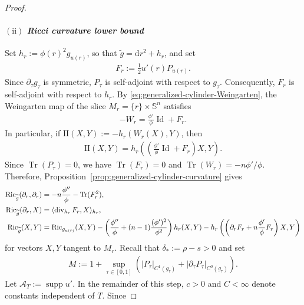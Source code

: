 \documentclass[11pt,reqno]{amsart}
\numberwithin{equation}{section}
\theoremstyle{definition}
\theoremstyle{remark}
\def\cA {\mathcal{A}}
\newcommand{\la}{\langle}
\newcommand{\ra}{\rangle}
\renewcommand{\div}{\operatorname{div}}
\newcommand{\supp}{\operatorname{supp}}
\newcommand{\Tr}{\operatorname{Tr}}
\newcommand{\Id}{\operatorname{Id}}
\newcommand{\ta}{\tau}
\newcommand{\ud}{\mathrm{d}}
\newcommand{\0}{\emptyset}
\newcommand{\bbS}{\mathbb S}
\newcommand{\Ric}{\operatorname{Ric}}
\begin{document}
\begin{proof}
\paragraph{$\mathrm{(ii)}$ \textit{Ricci curvature lower bound}} Set
$h_r:=\phi(r)^2g_{u(r)}$, so that
$\widetilde g=\ud r^2+h_r$, and set
\begin{align}
        F_r
        :=
        \frac12u'(r)P_{u(r)}.
\end{align}
Since $\partial_\ta g_\ta$ is symmetric, $P_\ta$ is self-adjoint with
respect to $g_\ta$. Consequently, $F_r$ is self-adjoint with respect to
$h_r$. By \eqref{eq:generalized-cylinder-Weingarten}, the Weingarten map of the slice $M_r=\{r\}\times\bbS^n$ satisfies
\begin{align}\label{eq:gaussian-split-shape-operator}
        -W_r
        =
        \frac{\phi'}{\phi}\Id+F_r.
\end{align}
In particular, if
$\mathrm{II}(X,Y):=-h_r(W_r(X),Y)$, then
\begin{align}
        \mathrm{II}(X,Y)
        =
        h_r
        \left(
        \left(
        \frac{\phi'}{\phi}\Id+F_r
        \right)X,Y
        \right).
\end{align}
Since $\Tr(P_\ta)=0$, we have
$\Tr(F_r)=0$ and
$\Tr(W_r)=-n\phi'/\phi$. Therefore,
Proposition~\ref{prop:generalized-cylinder-curvature} gives
\begin{align}\label{eq:gaussian-split-Ricci-rr-exact}
        \Ric_{\widetilde g}(\partial_r,\partial_r)
        &=
        -n\frac{\phi''}{\phi}
        -
        \Tr(F_r^2),\notag\\
        \Ric_{\widetilde g}(\partial_r,X)
        &=
        \la\div_{h_r}F_r,X\ra_{h_r},\notag\\
        \Ric_{\widetilde g}(X,Y)
        &=
        \Ric_{g_{u(r)}}(X,Y)
        -
        \left(
        \frac{\phi''}{\phi}
        +(n-1)\frac{(\phi')^2}{\phi^2}
        \right)h_r(X,Y)
        -
        h_r
        \left(
        \left(
        \partial_rF_r
        +
        n\frac{\phi'}{\phi}F_r
        \right)X,Y
        \right)
\end{align}
for vectors $X,Y$ tangent to $M_r$. Recall that $\delta_*:=\rho-s>0$ and set
\begin{align}
        M
        :=
        1+
        \sup_{\ta\in[0,1]}
        \left(
        |P_\ta|_{C^1(g_\ta)}
        +
        |\partial_\ta P_\ta|_{C^0(g_\ta)}
        \right).
\end{align}
Let $\cA_T:=\supp u'$. In the remainder of this step, $c>0$ and
$C<\infty$ denote constants independent of $T$. Since

\end{proof}
\end{document}
